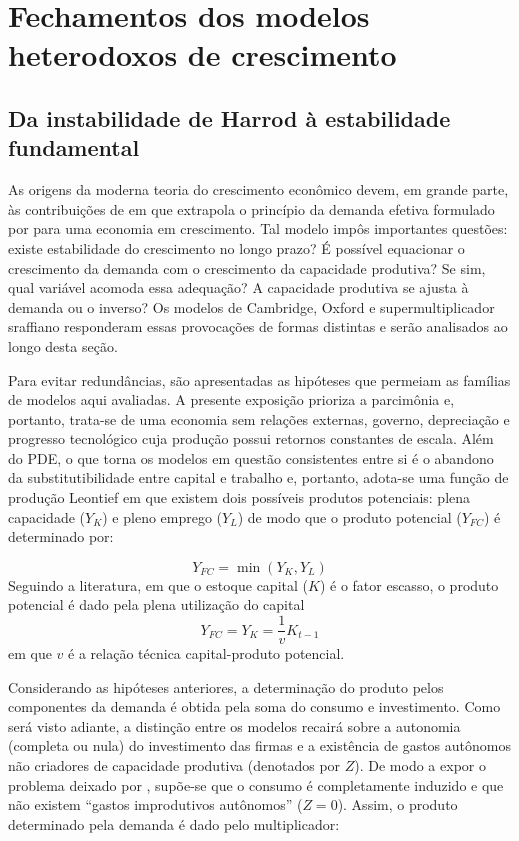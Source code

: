 \section{Fechamentos dos modelos heterodoxos de crescimento}\label{SecFechamentos}
\subsection{Da instabilidade de Harrod à estabilidade fundamental}
\label{SecHarrod}

As origens da moderna teoria do crescimento econômico devem, em grande parte, às contribuições de \textcite{harrod_essay_1939} em que extrapola o princípio da demanda efetiva formulado por \textcite{keynes_general_1936} para uma economia em crescimento. Tal modelo impôs importantes questões: existe estabilidade do crescimento no longo pra\-zo? É possível equacionar o crescimento da demanda com o crescimento da capacidade produtiva? Se sim, qual variável acomoda essa adequação? A capacidade produtiva se ajusta à demanda ou o inverso? Os modelos de Cambridge, Oxford e supermultiplicador sraffiano responderam essas provocações de formas distintas e serão analisados ao longo desta seção.

Para evitar redundâncias, são apresentadas as hipóteses que permeiam as famílias de modelos aqui avaliadas. 
A presente exposição prioriza a parcimônia e, portanto, trata-se de uma economia sem relações externas, governo, depreciação e progresso tecnológico cuja produção possui retornos constantes de escala. Além do PDE, o que torna os modelos em questão consistentes entre si é o abandono da substitutibilidade entre capital e trabalho e, portanto, adota-se uma função de produção Leontief em que existem dois possíveis produtos potenciais: plena capacidade ($Y_K$) e pleno emprego ($Y_L$) de modo que o produto potencial ($Y_{FC}$) é determinado por:

\begin{equation}
    Y_{FC} = \min (Y_K, Y_L)
\end{equation}
Seguindo a literatura, em que o estoque capital ($K$) é o fator escasso, o produto potencial é dado pela plena utilização do capital
\begin{equation}
\label{Oferta}
    Y_{FC} = Y_K = \frac{1}{v}K_{t-1}
\end{equation}
em que $v$ é a relação técnica capital-produto potencial. 


Considerando as hipóteses anteriores, a determinação do produto pelos componentes da demanda é obtida pela soma do consumo e investimento. Como será visto adiante, a distinção entre os modelos recairá sobre a autonomia (completa ou nula) do investimento das firmas e a existência de gastos autônomos não criadores de capacidade produtiva (denotados por $Z$). De modo a expor o problema deixado por \textcite{harrod_essay_1939}, supõe-se que o consumo é completamente induzido e que não existem ``gastos improdutivos autônomos'' ($Z=0$). Assim, o produto determinado pela demanda é dado pelo multiplicador:

